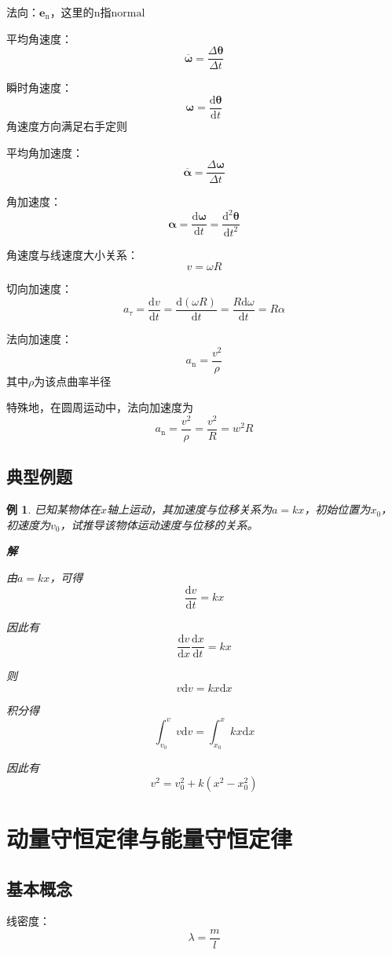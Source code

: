 \documentclass[12pt, a4paper, twoside]{ctexbook}
\newtheorem{example}[theorem]{例}
\begin{document}
{\sonti 法向}：$\boldsymbol{e}_\mathrm{n}$，这里的$\mathrm{n}$指$\mathrm{normal}$

{\sonti 平均角速度}：
$$
\overline{\boldsymbol{\omega}}=\frac{\Delta \boldsymbol{\theta}}{\Delta t}
$$

{\sonti 瞬时角速度}：
$$
\boldsymbol{\omega}=\frac{\mathrm{d}\boldsymbol{\theta}}{\mathrm{d}t}
$$
角速度方向满足右手定则

{\sonti 平均角加速度}：
$$
\overline{\boldsymbol{\alpha}}=\frac{\Delta\boldsymbol{\omega}}{\Delta t}
$$

{\sonti 角加速度}：
$$
\boldsymbol{\alpha}=\frac{\mathrm{d}\boldsymbol{\omega}}{\mathrm{d}t}= \frac{\mathrm{d}^2\boldsymbol{\theta}}{\mathrm{d}t^2}
$$

{\sonti 角速度与线速度大小关系}：
$$
v=\omega R
$$

{\sonti 切向加速度}：
$$
a_\tau=\frac{\mathrm{d}v}{\mathrm{d}t}=\frac{\mathrm{d}\left(\omega R\right)}{\mathrm{d}t}=\frac{R\mathrm{d}\omega}{\mathrm{d}t}=R\alpha
$$

{\sonti 法向加速度}：
$$
a_\mathrm{n}=\frac{v^2}{\rho}
$$
其中$\rho$为该点曲率半径

特殊地，在圆周运动中，法向加速度为
$$
a_\mathrm{n}=\frac{v^2}{\rho}=\frac{v^2}{R}=w^2R
$$

\section{典型例题}
\begin{example}
    已知某物体在$x$轴上运动，其加速度与位移关系为$a=kx$，初始位置为$x_0$，初速度为$v_0$，试推导该物体运动速度与位移的关系。

    \noindent\textbf{解}

    由$a=kx$，可得
    $$
    \frac{\mathrm{d}v}{\mathrm{d}t}=kx
    $$
    
    因此有
    $$
    \frac{\mathrm{d}v}{\mathrm{d}x}\frac{\mathrm{d}x}{\mathrm{d}t}=kx
    $$
    
    则
    $$
    v\mathrm{d}v=kx\mathrm{d}x
    $$
    
    积分得
    $$
    \int_{v_0}^{v}v\mathrm{d}v=\int_{x_0}^{x}kx\mathrm{d}x
    $$
    
    因此有
    $$
    v^2=v_0^2+k\left(x^2-x_0^2\right)
    $$
\end{example}
\chapter{动量守恒定律与能量守恒定律}
\newpage
\section{基本概念}
{\sonti 线密度}：
$$
\lambda=\frac{m}{l}
$$
\end{document}
